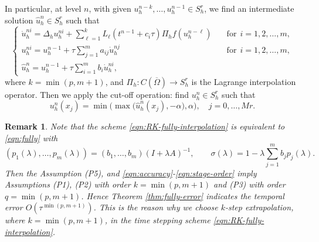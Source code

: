 \documentclass[a4paper, oneside]{book}
\newtheorem{remark}{Remark}[section]
\begin{document}

In particular, at level $n$, with given $u_h^{n-k},\ldots, u_h^{n-1}\in S_h^r$, we find an intermediate solution $\hat u_h^{n}\in S_h^r$ such that
\begin{equation}\label{eqn:RK-fully-interpolation}
    \begin{cases}
    \dot u_h^{ni} = \Delta_h u_h^{ni} +  \sum_{\ell=1}^k L_{\ell}(t^{n-1}+c_i\tau)\Pi_h f(u_h^{n-\ell}) &\quad \text{for} ~~i=1,2,\dots,m, \\ %
    u_h^{ni} = u_h^{n-1} + \tau \sum_{j=1}^m a_{ij} \dot u_h^{nj} &\quad \text{for} ~~i=1,2,\dots,m, \\
    \hat u_h^{n} = u_h^{n-1} + \tau \sum_{i=1}^m b_i \dot u_h^{ni},
  \end{cases}
\end{equation}
where $k=\min(p,m+1)$, and $\Pi_h:C(\overline\Omega)\rightarrow S_h^r$ is the Lagrange interpolation operator.
Then we apply the cut-off operation: find $u_h^n\in S_h^r$ such that
\begin{equation}\label{eqn:RK-cut}
u_h^n(x_j)  = \min\big(\max \big(\hat u_h^n(x_j), - \alpha \big) , \alpha \big),  \quad j=0,\dots,Mr.
\end{equation}


\begin{remark}\label{rem:equiv}
Note
that the scheme \eqref{eqn:RK-fully-interpolation} is equivalent to \eqref{eqn:fully} with
$$  (p_1(\lambda),\ldots,p_m(\lambda))= (b_1, \ldots, b_m) (I+\lambda A)^{-1},\qquad
 \sigma(\lambda) = 1-\lambda \sum_{j=1}^m b_j p_j(\lambda). $$
Then the Assumption (P5), and \eqref{eqn:accuracy}-\eqref{eqn:stage-order}
imply Assumptions (P1), (P2) with order $k=\min(p,m+1)$ and (P3) with order $q=\min(p,m+1)$.
Hence Theorem \ref{thm:fully-error} indicates the temporal error $O(\tau^{\min(p,m+1)})$.
This is the reason why we choose $k$-step extrapolation, where $k=\min(p,m+1)$, in the time stepping scheme \eqref{eqn:RK-fully-interpolation}.
\end{remark}
\end{document}

